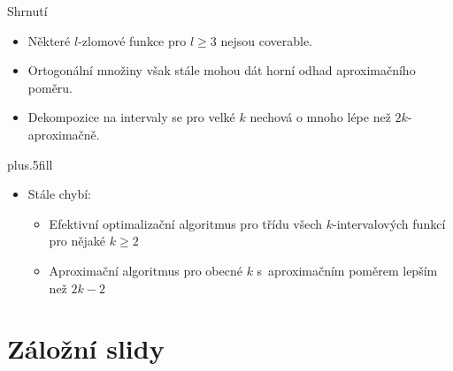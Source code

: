 \documentclass{beamer}
\theoremstyle{remark}
\begin{document}
\begin{frame}{Shrnutí}

  \begin{itemize}
  \item
    Některé $l$-zlomové funkce pro $l \geq 3$ nejsou coverable.
  \item
    Ortogonální množiny však stále mohou dát horní odhad aproximačního poměru.
  \item
    Dekompozice na intervaly se pro velké $k$ nechová o mnoho lépe než $2k$-aproximačně.
  \end{itemize}
  
  \vskip0pt plus.5fill
  \begin{itemize}
  \item
    Stále chybí:
    \begin{itemize}
    \item
      Efektivní optimalizační algoritmus pro třídu všech $k$-intervalových funkcí pro nějaké $k \geq 2$
    \item
      Aproximační algoritmus pro obecné $k$ s~aproximačním poměrem lepším než $2k-2$
    \end{itemize}
  \end{itemize}
\end{frame}

\appendix

\section{Záložní slidy}

\frame{\sectionpage}
\end{document}
